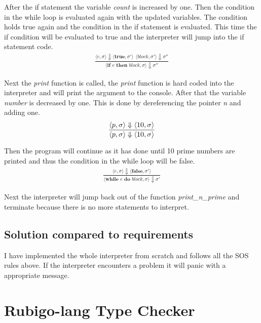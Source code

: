 \documentclass[12pt]{article}
\begin{document}
	After the if statement the variable \emph{count} is increased by one. Then the condition in the while loop is evaluated again with the updated variables. The condition holds true again and the condition in the if statement is evaluated. This time the if condition will be evaluated to true and the interpreter will jump into the if statement code.
	\begin{align*}
		\frac{\langle e, \sigma \rangle\Downarrow \langle \textbf{true}, \sigma' \rangle \ \
		\langle block, \sigma' \rangle\Downarrow \sigma''}
		{\langle \textbf{if } e \textbf{ then } block, \sigma \rangle\Downarrow \sigma''}
	\end{align*}

	Next the \emph{print} function is called, the \emph{print} function is hard coded into the interpreter and will print the argument to the console. After that the variable \emph{number} is decreased by one. This is done by dereferencing the pointer \emph{n} and adding one.
	\begin{align*}
		\frac{\langle \*p, \sigma \rangle\Downarrow \langle 10, \sigma \rangle}
		{\langle \*p, \sigma \rangle\Downarrow \langle 10, \sigma \rangle}
	\end{align*}
	
	Then the program will continue as it has done until 10 prime numbers are printed and thus the condition in the while loop will be false.
	\begin{align*}
		\frac{\langle e, \sigma \rangle\Downarrow \langle \textbf{false}, \sigma' \rangle}
		{\langle \textbf{while } e \textbf{ do } block, \sigma \rangle\Downarrow \sigma'}
	\end{align*}

	Next the interpreter will jump back out of the function \emph{print\_n\_prime} and terminate because there is no more statements to interpret.



    \subsection{Solution compared to requirements}
	I have implemented the whole interpreter from scratch and follows all the SOS rules above. If the interpreter encounters a problem it will panic with a appropriate message. 



    \section{Rubigo-lang Type Checker}	
\end{document}
